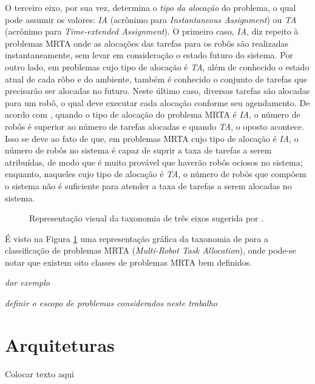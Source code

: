         O terceiro eixo, por sua vez, determina o \textit{tipo da alocação} do problema, o qual pode assumir os valores: \textit{IA} (acrônimo para \textit{Instantaneous Assignment}) ou \textit{TA} (acrônimo para \textit{Time-extended Assignment}). O primeiro caso, \textit{IA}, diz repeito à problemas MRTA onde as alocações das tarefas para os robôs são realizadas instantaneamente, sem levar em consideração o estado futuro do sistema. Por outro lado, em problemas cujo tipo de alocação é \textit{TA}, além de conhecido o estado atual de cada rôbo e do ambiente, também é conhecido o conjunto de tarefas que precisarão ser alocadas no futuro. Neste último caso, diversas tarefas são alocadas para um robô, o qual deve executar cada alocação conforme seu agendamento. De acordo com \cite{ref:bastos2008utility}, quando o tipo de alocação do problema MRTA é \textit{IA}, o número de robôs é superior ao número de tarefas alocadas e quando \textit{TA}, o oposto acontece. Isso se deve ao fato de que, em problemas MRTA cujo tipo de alocação é \textit{IA}, o número de robôs no sistema é capaz de suprir a taxa de tarefas a serem atribuídas, de modo que é muito provável que haverão robôs ociosos no sistema; enquanto, naqueles cujo tipo de alocação é \textit{TA}, o número de robôs que compõem o sistema não é suficiente para atender a taxa de tarefas a serem alocadas no sistema.
        
        \begin{figure}[htb]
            \centering
            
            \caption{Representação visual da taxonomia de três eixos sugerida por \cite{ref:gerkey2004taxonomy}.} \label{fig:taxomia_mrta}
        \end{figure}
        
        É visto na Figura \ref{fig:taxomia_mrta} uma representação gráfica da taxonomia de \cite{ref:gerkey2004taxonomy} para a classificação de problemas MRTA (\textit{Multi-Robot Task Allocation}), onde pode-se notar que existem oito classes de problemas MRTA bem definidos.
        
        \emph{\color{red} dar exemplo}
        
        \emph{\color{red} definir o escopo de problemas considerados neste trabalho}
    
    \section{Arquiteturas} \label{sec:sec3_3}
        Colocar texto aqui
        
